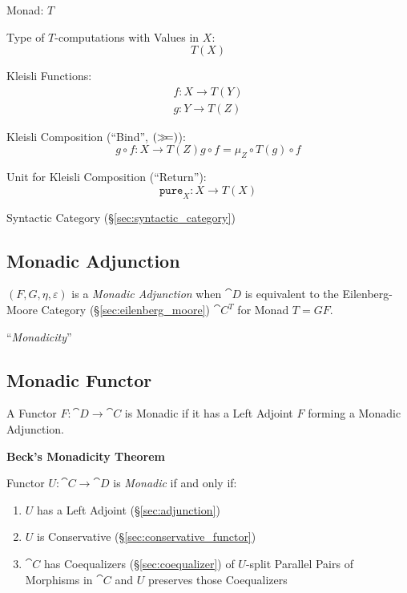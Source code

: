 Monad: $T$

Type of $T$-computations with Values in $X$:
\[
  T (X)
\]

Kleisli Functions:
\[
\begin{split}
  f : X \rightarrow T(Y) \\
  g : Y \rightarrow T(Z)
\end{split}
\]

Kleisli Composition (``Bind'', $\mathtt{(\mathsf{\gg\kern-3pt=})}$):
\[
  g \circ f : X \rightarrow T(Z)
  g \circ f = \mu_Z \circ T(g) \circ f
\]

Unit for Kleisli Composition (``Return''):
\[
  \mathtt{pure}_X : X \rightarrow T (X)
\]

Syntactic Category (\S\ref{sec:syntactic_category})



\subsection{Monadic Adjunction}\label{sec:monadic_adjunction}

$(F,G,\eta,\varepsilon)$ is a \emph{Monadic Adjunction} when
$\cat{D}$ is equivalent to the Eilenberg-Moore Category
(\S\ref{sec:eilenberg_moore}) $\cat{C}^T$ for Monad $T = GF$.

``\emph{Monadicity}''



\subsection{Monadic Functor}\label{sec:monadic_functor}

A Functor $F : \cat{D} \rightarrow \cat{C}$ is Monadic if it has
a Left Adjoint $F$ forming a Monadic Adjunction.

\textbf{Beck's Monadicity Theorem}

Functor $U : \cat{C} \rightarrow \cat{D}$ is \emph{Monadic} if
and only if:
\begin{enumerate}
  \item $U$ has a Left Adjoint (\S\ref{sec:adjunction})
  \item $U$ is Conservative (\S\ref{sec:conservative_functor})
  \item $\cat{C}$ has Coequalizers (\S\ref{sec:coequalizer}) of
    $U$-split Parallel Pairs of Morphisms in $\cat{C}$ and $U$
    preserves those Coequalizers
\end{enumerate}

